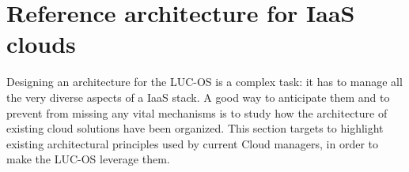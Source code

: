 \section{Reference architecture for IaaS clouds}
\label{sec:moreno}

Designing an architecture for the LUC-OS is a complex task: it has to manage all
the very diverse aspects of a IaaS stack. A good way to anticipate 
them and to prevent from missing any vital mechanisms is to study how the 
architecture of existing cloud solutions have been organized. This section 
targets to highlight existing architectural principles used by current Cloud 
managers, in order to make the LUC-OS leverage them.




